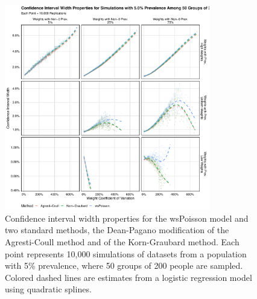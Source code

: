 \begin{figure}
\centering
\includegraphics[width=0.8\textwidth]{perfect_confidence_interval_width_50_groups_0_05_prev}
\caption{Confidence interval width properties for the wsPoisson model and two standard methods, the Dean-Pagano modification of the Agresti-Coull method and of the Korn-Graubard method.
Each point represents 10,000 simulations of datasets from a population with 5\% prevalence, where 50 groups of 200 people are sampled.
Colored dashed lines are estimates from a logistic regression model using quadratic splines.}
\label{ch_3:fig:perfect_confidence_interval_width_50_groups_0_05_prev}
\end{figure}


